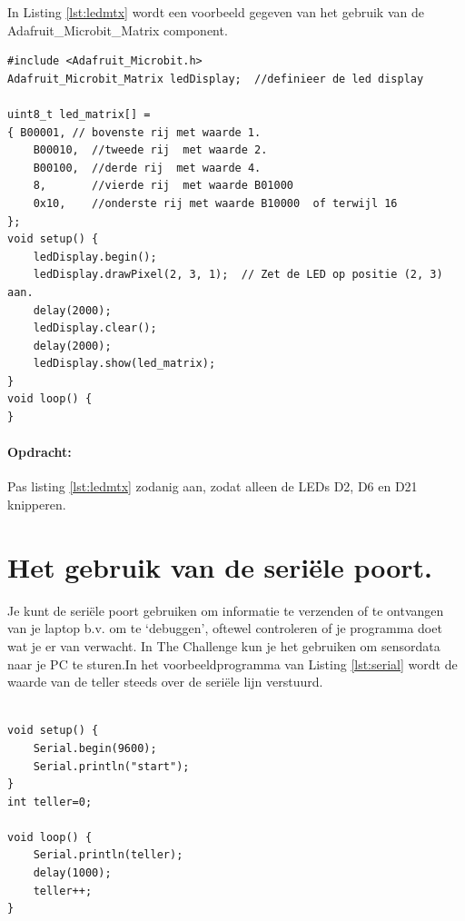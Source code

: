 In Listing \ref{lst:ledmtx} wordt een voorbeeld gegeven van het gebruik van de Adafruit\_Microbit\_Matrix component.

\begin{lstlisting}[caption= Een LED matrix demo,label={lst:ledmtx},firstnumber=1]		
#include <Adafruit_Microbit.h>
Adafruit_Microbit_Matrix ledDisplay;  //definieer de led display

uint8_t led_matrix[] =
{ B00001, // bovenste rij met waarde 1.
	B00010,  //tweede rij  met waarde 2.
	B00100,  //derde rij  met waarde 4.
	8,       //vierde rij  met waarde B01000
	0x10,    //onderste rij met waarde B10000  of terwijl 16
};
void setup() {
	ledDisplay.begin(); 
	ledDisplay.drawPixel(2, 3, 1);  // Zet de LED op positie (2, 3) aan.
	delay(2000);  
	ledDisplay.clear();  
	delay(2000);  
	ledDisplay.show(led_matrix);
}
void loop() {
}
\end{lstlisting}

\paragraph{Opdracht: }Pas listing \ref{lst:ledmtx} zodanig aan, zodat alleen de LEDs D2, D6 en D21 knipperen.\label{blz:opdrmLEDSmatrix}


\section{Het gebruik van de seriële poort.}

Je kunt de seriële poort gebruiken om informatie te verzenden of te ontvangen van je laptop b.v. om te ‘debuggen’, oftewel controleren of je programma doet wat je er van verwacht. In The Challenge kun je het gebruiken om sensordata naar je PC te sturen.In het voorbeeldprogramma van Listing \ref{lst:serial} wordt de waarde van de teller steeds over de seriële lijn verstuurd.

\begin{lstlisting}[caption= Een LED matrix demo,label={lst:serial},firstnumber=1]		
	
void setup() {
	Serial.begin(9600);
	Serial.println("start");
}
int teller=0;

void loop() {
	Serial.println(teller);
	delay(1000);
	teller++;
}
\end{lstlisting}


